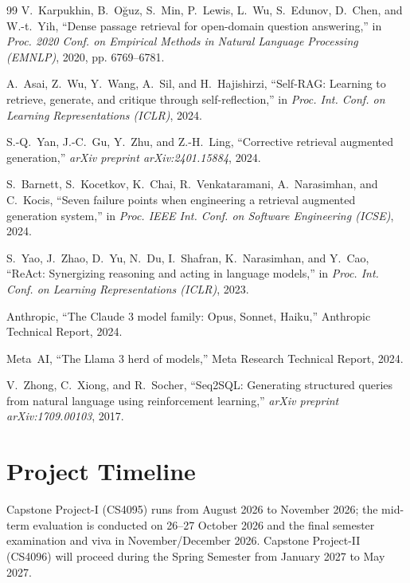 \documentclass[12pt,a4paper]{report}
\begin{document}
\begin{thebibliography}{99}
V.~Karpukhin, B.~O{\u{g}}uz, S.~Min, P.~Lewis, L.~Wu, S.~Edunov, D.~Chen, and W.-t.~Yih, ``Dense passage retrieval for open-domain question answering,'' in \emph{Proc. 2020 Conf. on Empirical Methods in Natural Language Processing (EMNLP)}, 2020, pp. 6769--6781.

A.~Asai, Z.~Wu, Y.~Wang, A.~Sil, and H.~Hajishirzi, ``Self-RAG: Learning to retrieve, generate, and critique through self-reflection,'' in \emph{Proc. Int. Conf. on Learning Representations (ICLR)}, 2024.

S.-Q.~Yan, J.-C.~Gu, Y.~Zhu, and Z.-H.~Ling, ``Corrective retrieval augmented generation,'' \emph{arXiv preprint arXiv:2401.15884}, 2024.

S.~Barnett, S.~Kocetkov, K.~Chai, R.~Venkataramani, A.~Narasimhan, and C.~Kocis, ``Seven failure points when engineering a retrieval augmented generation system,'' in \emph{Proc. IEEE Int. Conf. on Software Engineering (ICSE)}, 2024.

S.~Yao, J.~Zhao, D.~Yu, N.~Du, I.~Shafran, K.~Narasimhan, and Y.~Cao, ``ReAct: Synergizing reasoning and acting in language models,'' in \emph{Proc. Int. Conf. on Learning Representations (ICLR)}, 2023.

Anthropic, ``The Claude 3 model family: Opus, Sonnet, Haiku,'' Anthropic Technical Report, 2024.

Meta~AI, ``The Llama 3 herd of models,'' Meta Research Technical Report, 2024.

V.~Zhong, C.~Xiong, and R.~Socher, ``Seq2SQL: Generating structured queries from natural language using reinforcement learning,'' \emph{arXiv preprint arXiv:1709.00103}, 2017.

\end{thebibliography}

\section{Project Timeline}
Capstone Project-I (CS4095) runs from August 2026 to November 2026; the mid-term evaluation is conducted on 26--27 October 2026 and the final semester examination and viva in November/December 2026. Capstone Project-II (CS4096) will proceed during the Spring Semester from January 2027 to May 2027.
\end{document}
